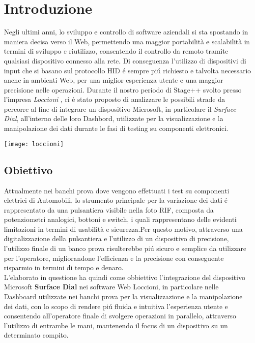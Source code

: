 \chapter{Introduzione}
\label{chap:intro}

Negli ultimi anni, lo sviluppo e controllo di software aziendali si sta spostando in maniera decisa verso il Web, permettendo una maggior portabilità e scalabilità in termini di sviluppo e riutilizzo, consentendo il controllo da remoto tramite qualsiasi dispositivo connesso alla rete. Di conseguenza l’utilizzo di dispositivi di input che si basano sul protocollo HID é sempre piú richiesto e talvolta necessario anche in ambienti Web, per una miglior esperienza utente e una maggior precisione nelle operazioni.
Durante il nostro periodo di Stage++ svolto presso l'impresa \emph{Loccioni} \cite{Loc}, ci é stato proposto di analizzare le possibili strade da percorre al fine di integrare un dispositivo Microsoft, in particolare il \emph{Surface Dial}, all'interno delle loro Dashbord, utilizzate per la visualizzazione e la manipolazione dei dati durante le fasi di testing su componenti elettronici.
\begin{center}
\texttt{[image: loccioni]}
\end{center}

\newpage
\section{Obiettivo}
Attualmente nei banchi prova dove vengono effettuati i test su componenti elettrici di Automobili, lo strumento principale per la variazione dei dati é rappresentato da una pulsantiera visibile nella foto RIF, composta da potenziometri analogici, bottoni e switch, i quali rappresentano delle evidenti limitazioni in termini  di usabilità e sicurezza.Per questo motivo, attraverso una digitalizzazione della pulsantiera e l'utilizzo di un dispositivo di precisione, l'utilizzo finale di un banco prova risulterebbe piú sicuro e semplice da utilizzare per l'operatore, migliorandone l'efficienza e la precisione con conseguente risparmio in termini di tempo e denaro.\\

L'elaborato in questione ha quindi come obbiettivo l'integrazione del dispositivo Microsoft \textbf{Surface Dial} nei software Web Loccioni, in particolare nelle Dashboard utilizzate nei banchi prova per la visualizzazione e la manipolazione dei dati, con lo scopo di rendere piú fluida e intuitiva l'esperienza utente e consentendo all'operatore finale di svolgere operazioni in parallelo, attraverso l'utilizzo di entrambe le mani, mantenendo il focus di un dispositivo su un determinato compito.\\

